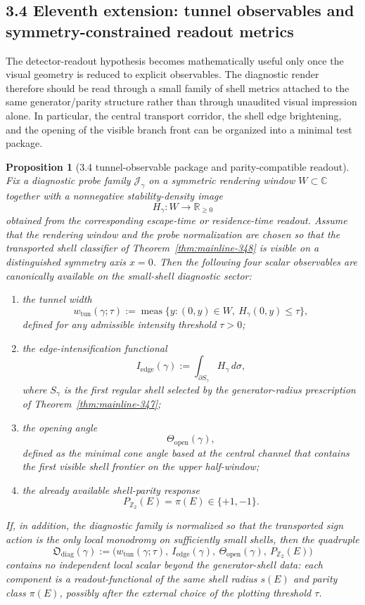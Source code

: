 \documentclass[12pt,a4paper]{article}
\newtheorem{proposition}[theorem]{Proposition}
\begin{document}
\subsection*{3.4 Eleventh extension: tunnel observables and symmetry-constrained readout metrics}
The detector-readout hypothesis becomes mathematically useful only once the visual geometry is reduced to explicit observables. The diagnostic render therefore should be read through a small family of shell metrics attached to the same generator/parity structure rather than through unaudited visual impression alone. In particular, the central transport corridor, the shell edge brightening, and the opening of the visible branch front can be organized into a minimal test package.

\begin{proposition}[3.4 tunnel-observable package and parity-compatible readout]
\label{prop:mainline-3410}
Fix a diagnostic probe family $\mathcal J_\gamma$ on a symmetric rendering window $W\subset\mathbb C$ together with a nonnegative stability-density image
\[
 H_\gamma:W\to\mathbb R_{\ge 0}
\]
obtained from the corresponding escape-time or residence-time readout. Assume that the rendering window and the probe normalization are chosen so that the transported shell classifier of Theorem~\ref{thm:mainline-348} is visible on a distinguished symmetry axis $x=0$. Then the following four scalar observables are canonically available on the small-shell diagnostic sector:
\begin{enumerate}[label=(\roman*)]
 \item the \emph{tunnel width}
 \[
 w_{\mathrm{tun}}(\gamma;\tau)
 :=\operatorname{meas}\bigl\{y:(0,y)\in W,\ H_\gamma(0,y)\le \tau\bigr\},
 \]
 defined for any admissible intensity threshold $\tau>0$;
 \item the \emph{edge-intensification functional}
 \[
 I_{\mathrm{edge}}(\gamma)
 :=\int_{\partial S_\gamma} H_\gamma\,d\sigma,
 \]
 where $S_\gamma$ is the first regular shell selected by the generator-radius prescription of Theorem~\ref{thm:mainline-347};
 \item the \emph{opening angle}
 \[
 \Theta_{\mathrm{open}}(\gamma),
 \]
 defined as the minimal cone angle based at the central channel that contains the first visible shell frontier on the upper half-window;
 \item the already available shell-parity response
 \[
 P_{\mathbb Z_2}(E)=\pi(E)\in\{+1,-1\}.
 \]
\end{enumerate}
If, in addition, the diagnostic family is normalized so that the transported sign action is the only local monodromy on sufficiently small shells, then the quadruple
\[
 \mathfrak O_{\mathrm{diag}}(\gamma)
 :=\bigl(w_{\mathrm{tun}}(\gamma;\tau),\ I_{\mathrm{edge}}(\gamma),\ \Theta_{\mathrm{open}}(\gamma),\ P_{\mathbb Z_2}(E)\bigr)
\]
contains no independent local scalar beyond the generator-shell data: each component is a readout-functional of the same shell radius $s(E)$ and parity class $\pi(E)$, possibly after the external choice of the plotting threshold $\tau$.
\end{proposition}
\end{document}
